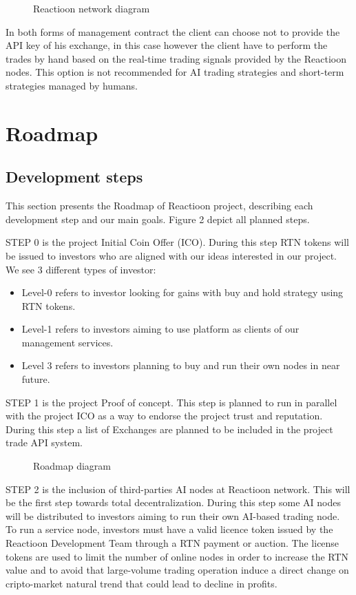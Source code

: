 \documentclass[
	article,			%
	12pt,				%
	oneside,			%
	a4paper,			%
	brazil,				%
	english,
	sumario=tradicional
	]{abntex2}
\begin{document}
\begin{figure}[H]
    \centering
    \makebox[\textwidth]{}
\caption{Reactioon network diagram}
\end{figure}

In both forms of management contract the client can choose not to provide the API key of his exchange, in this case however the client have to perform the trades by hand based on the real-time trading signals provided by the Reactioon nodes. This option is not recommended for AI trading strategies and short-term strategies managed by humans.

\section{Roadmap}
\subsection{Development steps}
This section presents the Roadmap of Reactioon project, describing each development step and our main goals. Figure 2 depict all planned steps.

STEP 0 is the project Initial Coin Offer (ICO). During this step RTN tokens will be issued to investors who are aligned with our ideas interested in our project. We see 3 different types of investor:
\begin{itemize}
    \item Level-0 refers to  investor looking for gains with buy and hold strategy using RTN tokens. 
    \item Level-1 refers to investors aiming to use platform as clients of our management services. 
    \item Level 3 refers to investors planning to buy and run their own nodes in near future. 
\end{itemize}

STEP 1 is the project Proof of concept. This step is planned to run in parallel with the project ICO as a way to endorse the project trust and reputation. During this step a list of Exchanges are planned to be included in the project trade API system.





\begin{figure}[H]
    \centering
    \makebox[\textwidth]{}
\caption{Roadmap diagram}
\end{figure}
STEP 2 is the inclusion of third-parties AI nodes at Reactioon network. This will be the first step towards total decentralization. During this step some AI nodes will be distributed to investors aiming to run their own AI-based trading node. To run a service node, investors must have a valid licence token issued by the Reactioon Development Team through a RTN payment or auction. The license tokens are used to limit the number of online nodes in order to increase the RTN value and to avoid that large-volume trading operation induce a direct change on cripto-market natural trend that could lead to decline in profits. 
\end{document}
